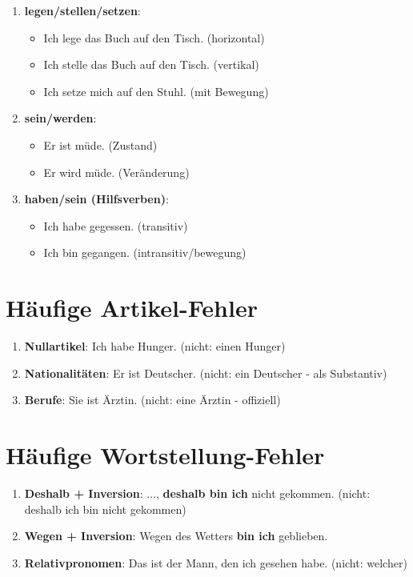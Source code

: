 \begin{enumerate}
    \item \textbf{legen/stellen/setzen}:
        \begin{itemize}
            \item Ich lege das Buch auf den Tisch. (horizontal)
            \item Ich stelle das Buch auf den Tisch. (vertikal)
            \item Ich setze mich auf den Stuhl. (mit Bewegung)
        \end{itemize}
    \item \textbf{sein/werden}:
        \begin{itemize}
            \item Er ist müde. (Zustand)
            \item Er wird müde. (Veränderung)
        \end{itemize}
    \item \textbf{haben/sein (Hilfsverben)}:
        \begin{itemize}
            \item Ich habe gegessen. (transitiv)
            \item Ich bin gegangen. (intransitiv/bewegung)
        \end{itemize}
\end{enumerate}

\section{Häufige Artikel-Fehler}
\label{sec:ArtikelFehler}

\begin{enumerate}
    \item \textbf{Nullartikel}: Ich habe Hunger. (nicht: einen Hunger)
    \item \textbf{Nationalitäten}: Er ist Deutscher. (nicht: ein Deutscher - als Substantiv)
    \item \textbf{Berufe}: Sie ist Ärztin. (nicht: eine Ärztin - offiziell)
\end{enumerate}

\section{Häufige Wortstellung-Fehler}
\label{sec:WortstellungFehler}

\begin{enumerate}
    \item \textbf{Deshalb + Inversion}: ..., \textbf{deshalb bin ich} nicht gekommen. (nicht: deshalb ich bin nicht gekommen)
    \item \textbf{Wegen + Inversion}: Wegen des Wetters \textbf{bin ich} geblieben.
    \item \textbf{Relativpronomen}: Das ist der Mann, den ich gesehen habe. (nicht: welcher)
\end{enumerate}

